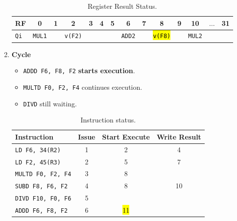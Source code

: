 \begin{enumerate}
    \newpage

    \begin{table}[!htp]
        \centering
        \begin{tabular}{@{} l | c c c c c c c c c c c c c @{}}
            \toprule
            RF              & 0                     & 1             & 2                     & 3             & 4             & 5             & 6                     & 7             & 8                     & 9             & 10                    & $\dots$           & 31            \\
            \midrule
            \texttt{Qi}     & \texttt{MUL1}         &               & \texttt{v(F2)}        &               &               &               & \texttt{ADD2}         &               & \hl{\texttt{v(F8)}}   &               & \texttt{MUL2}         &                   &               \\
            \bottomrule
        \end{tabular}
        \caption*{Register Result Status.}
    \end{table}

    \newpage


    \item \textbf{Cycle \theenumi}
    \begin{itemize}
        \item \texttt{ADDD  F6, F8, F2} \textbf{starts execution}.
        \item \texttt{MULTD F0, F2, F4} continues execution.
        \item \texttt{DIVD} still waiting.
    \end{itemize}

    \begin{table}[!htp]
        \centering
        \begin{tabular}{@{} l | c c c @{}}
            \toprule
            Instruction                 & Issue & Start Execute & Write Result  \\
            \midrule
            \texttt{LD    F6, 34(R2)}   & 1     & 2             & 4             \\ [.3em]
            \texttt{LD    F2, 45(R3)}   & 2     & 5             & 7             \\ [.3em]
            \texttt{MULTD F0, F2, F4}   & 3     & 8             &               \\ [.3em]
            \texttt{SUBD  F8, F6, F2}   & 4     & 8             & 10            \\ [.3em]
            \texttt{DIVD  F10, F0, F6}  & 5     &               &               \\ [.3em]
            \texttt{ADDD  F6, F8, F2}   & 6     & \hl{11}       &               \\
            \bottomrule
        \end{tabular}
        \caption*{Instruction status.}
    \end{table}


\end{enumerate}
